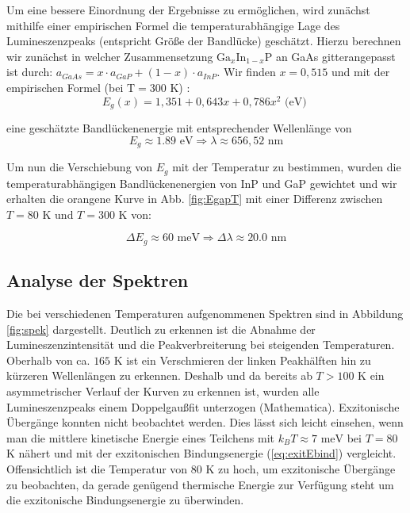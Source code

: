\documentclass[aps,twocolumn,secnumarabic,nobalancelastpage,amsmath,amssymb,
nofootinbib,superscriptaddress]{revtex4-1}
\begin{document}
\noindent Um eine bessere Einordnung der Ergebnisse zu ermöglichen, wird zunächst mithilfe einer empirischen
Formel die temperaturabhängige Lage des Lumineszenzpeaks (entspricht Größe der Bandlücke) geschätzt.
Hierzu berechnen wir zunächst in welcher Zusammensetzung $\text{Ga}_x\text{In}_{1-x}\text{P}$
an GaAs gitterangepasst ist durch: $a_{GaAs} = x\cdot a_{GaP}+(1-x)\cdot a_{InP}$. Wir finden
$x=0,515$ und mit der empirischen Formel (bei $\text{T}=300\text{ K}$) \cite{vorbereitung}:
\begin{equation}
  E_{g}(x) = 1,351+0,643x+0,786x^2\text{ (eV) }
   \label{eq:Ex}
\end{equation}

\noindent eine geschätzte Bandlückenenergie mit entsprechender Wellenlänge von
\begin{equation}
  E_g \approx 1.89\text{ eV} \Rightarrow  \lambda \approx 656,52\text{ nm}
  \label{eq:evEgap300K}
\end{equation}

\noindent Um nun die Verschiebung von $E_g$ mit der Temperatur zu bestimmen, wurden
die temperaturabhängigen Bandlückenenergien von InP und GaP gewichtet und wir erhalten
die orangene Kurve in Abb. \ref{fig:EgapT} mit einer Differenz zwischen $T=80\text{ K}$
und $T=300\text{ K}$ von:

\begin{equation}
  \Delta E_g \approx 60\text{ meV} \Rightarrow \Delta\lambda \approx 20.0\text{ nm}
\label{eq:evVersch}
\end{equation}

\subsection{Analyse der Spektren}

\noindent Die bei verschiedenen Temperaturen aufgenommenen Spektren sind in Abbildung \ref{fig:spek} dargestellt.
Deutlich zu erkennen ist die Abnahme der Lumineszenzintensität und die Peakverbreiterung bei steigenden Temperaturen.
Oberhalb von ca. $165\text{ K}$ ist ein Verschmieren der linken Peakhälften hin zu kürzeren Wellenlängen zu erkennen.
Deshalb und da bereits ab $T>100$ K ein asymmetrischer Verlauf der Kurven zu erkennen ist, wurden alle Lumineszenzpeaks
einem Doppelgaußfit unterzogen (Mathematica).
Exzitonische Übergänge konnten nicht beobachtet werden. Dies lässt sich leicht
einsehen, wenn man die mittlere kinetische Energie eines Teilchens mit $k_B T\approx 7\text{ meV}$ bei $T=80$ K nähert und
mit der exzitonischen Bindungsenergie (\ref{eq:exitEbind}) vergleicht. Offensichtlich ist die Temperatur
von 80 K zu hoch, um exzitonische Übergänge zu beobachten, da gerade genügend thermische Energie zur Verfügung steht
um die exzitonische Bindungsenergie zu überwinden.
\end{document}
